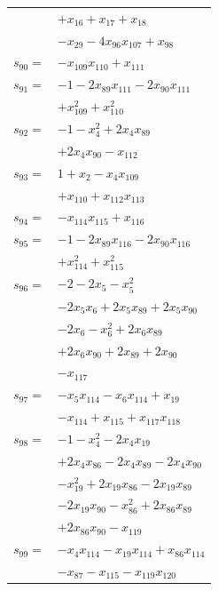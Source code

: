 \begin{longtable}{@{}r@{\;}l@{}}
 & \(\displaystyle +x_{16} +x_{17} +x_{18}\) \\
 & \(\displaystyle -x_{29} -4x_{96}x_{107} +x_{98}\) \\[3pt]
\(s_{90}=\) & \(\displaystyle -x_{109}x_{110} +x_{111}\) \\[3pt]
\(s_{91}=\) & \(\displaystyle -1 -2x_{89}x_{111} -2x_{90}x_{111}\) \\
 & \(\displaystyle +x_{109}^{2} +x_{110}^{2}\) \\[3pt]
\(s_{92}=\) & \(\displaystyle -1 -x_{4}^{2} +2x_{4}x_{89}\) \\
 & \(\displaystyle +2x_{4}x_{90} -x_{112}\) \\[3pt]
\(s_{93}=\) & \(\displaystyle 1 +x_{2} -x_{4}x_{109}\) \\
 & \(\displaystyle +x_{110} +x_{112}x_{113}\) \\[3pt]
\(s_{94}=\) & \(\displaystyle -x_{114}x_{115} +x_{116}\) \\[3pt]
\(s_{95}=\) & \(\displaystyle -1 -2x_{89}x_{116} -2x_{90}x_{116}\) \\
 & \(\displaystyle +x_{114}^{2} +x_{115}^{2}\) \\[3pt]
\(s_{96}=\) & \(\displaystyle -2 -2x_{5} -x_{5}^{2}\) \\
 & \(\displaystyle -2x_{5}x_{6} +2x_{5}x_{89} +2x_{5}x_{90}\) \\
 & \(\displaystyle -2x_{6} -x_{6}^{2} +2x_{6}x_{89}\) \\
 & \(\displaystyle +2x_{6}x_{90} +2x_{89} +2x_{90}\) \\
 & \(\displaystyle -x_{117}\) \\[3pt]
\(s_{97}=\) & \(\displaystyle -x_{5}x_{114} -x_{6}x_{114} +x_{19}\) \\
 & \(\displaystyle -x_{114} +x_{115} +x_{117}x_{118}\) \\[3pt]
\(s_{98}=\) & \(\displaystyle -1 -x_{4}^{2} -2x_{4}x_{19}\) \\
 & \(\displaystyle +2x_{4}x_{86} -2x_{4}x_{89} -2x_{4}x_{90}\) \\
 & \(\displaystyle -x_{19}^{2} +2x_{19}x_{86} -2x_{19}x_{89}\) \\
 & \(\displaystyle -2x_{19}x_{90} -x_{86}^{2} +2x_{86}x_{89}\) \\
 & \(\displaystyle +2x_{86}x_{90} -x_{119}\) \\[3pt]
\(s_{99}=\) & \(\displaystyle -x_{4}x_{114} -x_{19}x_{114} +x_{86}x_{114}\) \\
 & \(\displaystyle -x_{87} -x_{115} -x_{119}x_{120}\) \\[3pt]

\end{longtable}

